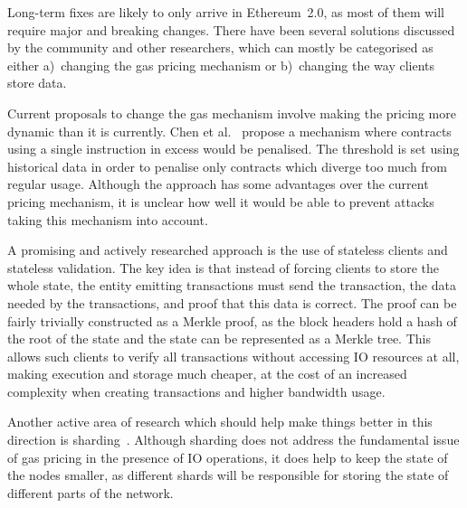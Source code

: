 Long-term fixes are likely to only arrive in Ethereum~2.0, as most of them will require major and breaking changes. There have been several solutions discussed by the community and other researchers, which can mostly be categorised as either a)~changing the gas pricing mechanism or b)~changing the way clients store data.

Current proposals to change the gas mechanism involve making the pricing more dynamic than it is currently. Chen et al.~\cite{Chen2017Metering} propose a mechanism where contracts using a single instruction in excess would be penalised. The threshold is set using historical data in order to penalise only contracts which diverge too much from regular usage. Although the approach has some advantages over the current pricing mechanism, it is unclear how well it would be able to prevent attacks taking this mechanism into account.

A promising and actively researched approach is the use of stateless clients and stateless validation. The key idea is that instead of forcing clients to store the whole state, the entity emitting transactions must send the transaction, the data needed by the transactions, and proof that this data is correct. The proof can be fairly trivially constructed as a Merkle proof, as the block headers hold a hash of the root of the state and the state can be represented as a Merkle tree. This allows such clients to verify all transactions without accessing IO resources at all, making execution and storage much cheaper, at the cost of an increased complexity when creating transactions and higher bandwidth usage.

Another active area of research which should help make things better in this direction is sharding~\cite{al2017chainspace}. Although sharding does not address the fundamental issue of gas pricing in the presence of IO operations, it does help to keep the state of the nodes smaller, as different shards will be responsible for storing the state of different parts of the network.
